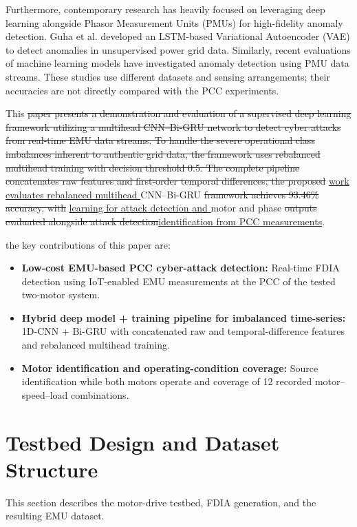 \documentclass[conference,letterpaper]{IEEEtran}
\providecommand{\DIFadd}[1]{{\protect\color{blue}\uline{#1}}} %
\providecommand{\DIFdel}[1]{{\protect\color{red}\sout{#1}}}                      %
\providecommand{\DIFaddbegin}{} %
\providecommand{\DIFaddend}{} %
\providecommand{\DIFdelbegin}{} %
\providecommand{\DIFdelend}{} %
\begin{document}
Furthermore, contemporary research has heavily focused on leveraging deep learning alongside Phasor Measurement Units (PMUs) for high-fidelity anomaly detection. Guha et al. \cite{guha} developed an LSTM-based Variational Autoencoder (VAE) to detect anomalies in unsupervised power grid data. Similarly, recent evaluations of machine learning models \cite{pmu_lstm_2025} have investigated anomaly detection using PMU data streams. These studies use different datasets and sensing arrangements; their accuracies are not directly compared with the PCC experiments.


This \DIFdelbegin \DIFdel{paper presents a demonstration and evaluation of a supervised deep learning framework utilizing a multihead CNN--Bi-GRU network to detect cyber attacks from real-time EMU data streams. To handle the severe operational class imbalances inherent to authentic grid data, the framework uses rebalanced multihead training with decision threshold 0.5. The complete pipeline concatenates raw features and first-order temporal differences; the proposed }\DIFdelend \DIFaddbegin \DIFadd{work evaluates rebalanced multihead }\DIFaddend CNN--Bi-GRU \DIFdelbegin \DIFdel{framework achieves 93.46\% accuracy, with }\DIFdelend \DIFaddbegin \DIFadd{learning for attack detection and }\DIFaddend motor and phase \DIFdelbegin \DIFdel{outputs evaluated alongside attack detection}\DIFdelend \DIFaddbegin \DIFadd{identification from PCC measurements}\DIFaddend .

the key contributions of this paper are:
\begin{itemize}
    \item \textbf{Low-cost EMU-based PCC cyber-attack detection:} Real-time FDIA detection using IoT-enabled EMU measurements at the PCC of the tested two-motor system.
    \item \textbf{Hybrid deep model + training pipeline for imbalanced time-series:} 1D-CNN + Bi-GRU with concatenated raw and temporal-difference features and rebalanced multihead training.
    \item \textbf{Motor identification and operating-condition coverage:} Source identification while both motors operate and coverage of 12 recorded motor--speed--load combinations.
\end{itemize}




\section{Testbed Design and Dataset Structure}
This section describes the motor-drive testbed, FDIA generation, and the resulting EMU dataset.
\end{document}

